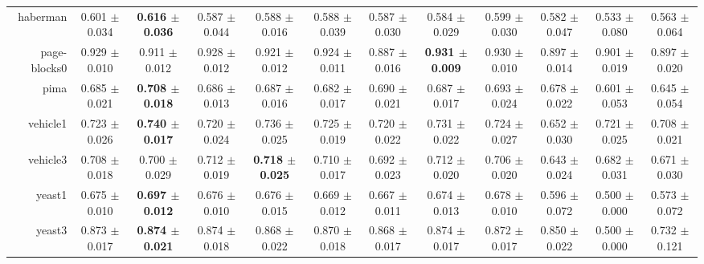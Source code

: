 \begin{table}[!ht]
{\begin{tabular}{r c c c c c c c c c c c}
haberman & 0.601 $\pm$ 0.034 & \textbf{0.616 $\pm$ 0.036} & 0.587 $\pm$ 0.044 & 0.588 $\pm$ 0.016 & 0.588 $\pm$ 0.039 & 0.587 $\pm$ 0.030 & 0.584 $\pm$ 0.029 & 0.599 $\pm$ 0.030 & 0.582 $\pm$ 0.047 & 0.533 $\pm$ 0.080 & 0.563 $\pm$ 0.064 \\
page-blocks0 & 0.929 $\pm$ 0.010 & 0.911 $\pm$ 0.012 & 0.928 $\pm$ 0.012 & 0.921 $\pm$ 0.012 & 0.924 $\pm$ 0.011 & 0.887 $\pm$ 0.016 & \textbf{0.931 $\pm$ 0.009} & 0.930 $\pm$ 0.010 & 0.897 $\pm$ 0.014 & 0.901 $\pm$ 0.019 & 0.897 $\pm$ 0.020 \\
pima & 0.685 $\pm$ 0.021 & \textbf{0.708 $\pm$ 0.018} & 0.686 $\pm$ 0.013 & 0.687 $\pm$ 0.016 & 0.682 $\pm$ 0.017 & 0.690 $\pm$ 0.021 & 0.687 $\pm$ 0.017 & 0.693 $\pm$ 0.024 & 0.678 $\pm$ 0.022 & 0.601 $\pm$ 0.053 & 0.645 $\pm$ 0.054 \\
vehicle1 & 0.723 $\pm$ 0.026 & \textbf{0.740 $\pm$ 0.017} & 0.720 $\pm$ 0.024 & 0.736 $\pm$ 0.025 & 0.725 $\pm$ 0.019 & 0.720 $\pm$ 0.022 & 0.731 $\pm$ 0.022 & 0.724 $\pm$ 0.027 & 0.652 $\pm$ 0.030 & 0.721 $\pm$ 0.025 & 0.708 $\pm$ 0.021 \\
vehicle3 & 0.708 $\pm$ 0.018 & 0.700 $\pm$ 0.029 & 0.712 $\pm$ 0.019 & \textbf{0.718 $\pm$ 0.025} & 0.710 $\pm$ 0.017 & 0.692 $\pm$ 0.023 & 0.712 $\pm$ 0.020 & 0.706 $\pm$ 0.020 & 0.643 $\pm$ 0.024 & 0.682 $\pm$ 0.031 & 0.671 $\pm$ 0.030 \\
yeast1 & 0.675 $\pm$ 0.010 & \textbf{0.697 $\pm$ 0.012} & 0.676 $\pm$ 0.010 & 0.676 $\pm$ 0.015 & 0.669 $\pm$ 0.012 & 0.667 $\pm$ 0.011 & 0.674 $\pm$ 0.013 & 0.678 $\pm$ 0.010 & 0.596 $\pm$ 0.072 & 0.500 $\pm$ 0.000 & 0.573 $\pm$ 0.072 \\
yeast3 & 0.873 $\pm$ 0.017 & \textbf{0.874 $\pm$ 0.021} & 0.874 $\pm$ 0.018 & 0.868 $\pm$ 0.022 & 0.870 $\pm$ 0.018 & 0.868 $\pm$ 0.017 & 0.874 $\pm$ 0.017 & 0.872 $\pm$ 0.017 & 0.850 $\pm$ 0.022 & 0.500 $\pm$ 0.000 & 0.732 $\pm$ 0.121 \\
\end{tabular}}
\end{table}
